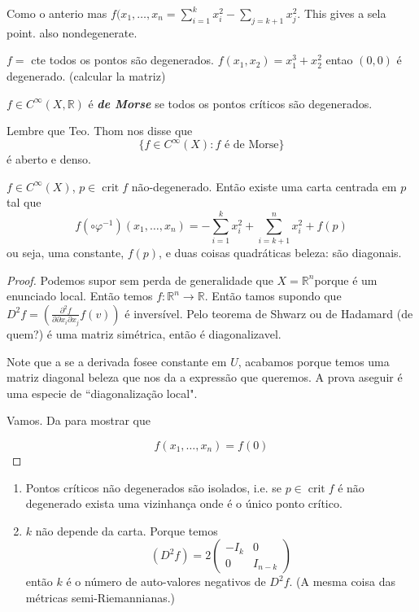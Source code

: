\begin{example}\leavevmode
Como o anterio mas \(f(x_1,\ldots,x_n=\sum_{i=1}^k x_i^2 -\sum_{j=k+1}x_j^2\). This gives a sela point. also nondegenerate.
\end{example}

\begin{example}\leavevmode
\(f=\) cte todos os pontos são degenerados. \(f(x_1,x_2)=x_1^3+x_2^2\) entao \((0,0)\) é degenerado. (calcular la matriz)
\end{example}

\begin{defn}\leavevmode
\(f \in C^\infty (X,\mathbb{R})\) é \textit{\textbf{de Morse}} se todos os pontos críticos são degenerados.
\end{defn}

\begin{prop}\leavevmode
Lembre que Teo. Thom nos disse que
\[\{ f \in C^\infty(X): f\text{ é de Morse} \}\]
é aberto e denso.
\end{prop}

\begin{lemma}[de Morse]\leavevmode
\(f \in C^\infty(X)\), \(p \in \operatorname{crit}f\) não-degenerado. Então existe uma carta centrada em \(p\) tal que
\[f(\circ \varphi^{-1})(x_1,\ldots,x_n)=-\sum_{i=1}^k x_i^2+ \sum_{i=k+1}^nx_i^2+f(p)\]
ou seja, uma constante, \(f(p)\), e duas coisas quadráticas beleza: são diagonais.
\end{lemma}

\begin{proof}\leavevmode
Podemos supor sem perda de generalidade que \(X=\mathbb{R}^n\)porque é um enunciado local. Então temos \(f: \mathbb{R}^n \to \mathbb{R}\). Então tamos supondo que \(D^2f=\left(\frac{\partial ^2 f}{\partial \partial x_i \partial x_j}f(v)\right) \) é inversível. Pelo teorema de Shwarz ou de Hadamard (de quem?) é uma matriz simétrica, então é diagonalizavel.

Note que a se a derivada fosee constante em \(U\), acabamos porque temos uma matriz diagonal beleza que nos da a expressão que queremos. A prova aseguir é uma especie de ``diagonalização local".

Vamos. Da para mostrar que 

\[f(x_1,\ldots,x_n)= f(0)\]

\end{proof}

\begin{coro}\leavevmode
\begin{enumerate}
\item Pontos críticos não degenerados são isolados, i.e. se \(p \in \operatorname{crit}f\) é não degenerado exista uma vizinhança onde é o único ponto crítico.
\item \(k\) não depende da carta. Porque temos
	\[(D^2f)=2 \begin{pmatrix} -I_k&  0\\ 0 &  I_{n-k} \end{pmatrix} \]
então \(k\) é o número de auto-valores negativos de \(D^2f\). (A mesma coisa das métricas semi-Riemannianas.)
\end{enumerate}
\end{coro}

